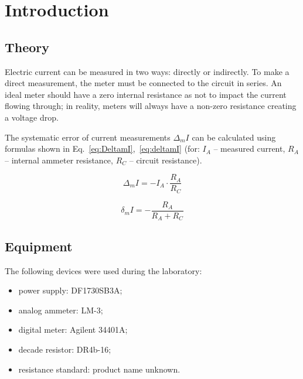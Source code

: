 \section{Introduction}

\subsection{Theory}

Electric current can be measured in two ways: directly or indirectly. To make a direct measurement, the meter must be connected to the circuit in series. An ideal meter should have a zero internal resistance as not to impact the current flowing through; in reality, meters will always have a non-zero resistance creating a voltage drop.

The systematic error of current measurements $\Delta_m I$ can be calculated using formulas shown in Eq.~\ref{eq:DeltamI},~\ref{eq:deltamI} (for: $I_A$ -- measured current, $R_A$ -- internal ammeter resistance, $R_C$ -- circuit resistance). 

\begin{equation}
	\Delta_m I = -I_A \cdot\frac{R_A}{R_C}	
	\label{eq:DeltamI}
\end{equation}

\begin{equation}
	\delta_m I = -\frac{R_A}{R_A + R_C}
	\label{eq:deltamI}
\end{equation}

\subsection{Equipment}

The following devices were used during the laboratory:

\begin{itemize}
	\item power supply: DF1730SB3A;
	\item analog ammeter: LM-3;
	\item digital meter: Agilent 34401A;
	\item decade resistor: DR4b-16;
	\item resistance standard: product name unknown.
\end{itemize}